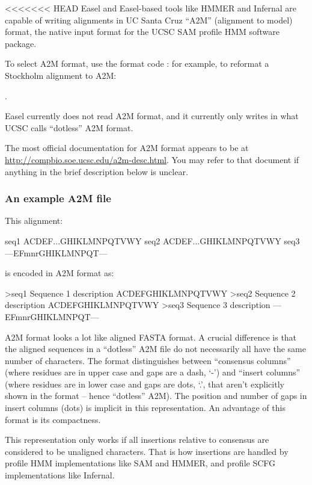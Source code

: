 <<<<<<< HEAD
Easel and Easel-based tools like HMMER and Infernal are capable of
writing alignments in UC Santa Cruz ``A2M'' (alignment to model)
format, the native input format for the UCSC SAM profile HMM software
package.

To select A2M format, use the format code : for example, 
to reformat a Stockholm alignment to A2M:

.

Easel currently does not read A2M format, and it currently only writes
in what UCSC calls ``dotless'' A2M format.

The most official documentation for A2M format appears to be at
\url{http://compbio.soe.ucsc.edu/a2m-desc.html}. You may refer to that
document if anything in the brief description below is unclear.

\subsubsection{An example A2M file}

This alignment:

\begin{cchunk}
seq1  ACDEF...GHIKLMNPQTVWY
seq2  ACDEF...GHIKLMNPQTVWY
seq3  ---EFmnrGHIKLMNPQT---
\end{cchunk}

\noindent 
is encoded in A2M format as:

\begin{cchunk}
>seq1  Sequence 1 description
ACDEFGHIKLMNPQTVWY
>seq2  Sequence 2 description
ACDEFGHIKLMNPQTVWY
>seq3  Sequence 3 description
---EFmnrGHIKLMNPQT---
\end{cchunk}

A2M format looks a lot like aligned FASTA format. A crucial difference
is that the aligned sequences in a ``dotless'' A2M file do not
necessarily all have the same number of characters. The format
distinguishes between ``consensus columns'' (where residues are in
upper case and gaps are a dash, `-') and ``insert columns'' (where
residues are in lower case and gaps are dots, `.', that aren't
explicitly shown in the format -- hence ``dotless'' A2M). The position
and number of gaps in insert columns (dots) is implicit in this
representation.  An advantage of this format is its compactness.

This representation only works if all insertions relative to consensus
are considered to be unaligned characters. That is how insertions are
handled by profile HMM implementations like SAM and HMMER, and profile
SCFG implementations like Infernal.

